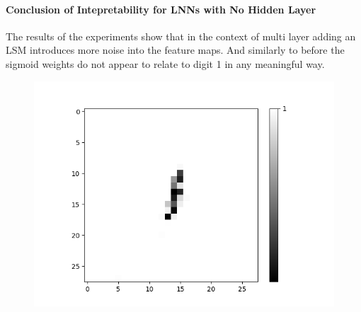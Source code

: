 \begin{minipage}[t]{0.45\textwidth}
	\vspace{0px}
	\paragraph{Conclusion of Intepretability for LNNs with No Hidden Layer}
	The results of the experiments show that in the context of multi layer adding an LSM introduces more noise into the feature maps. And similarly to before the sigmoid weights do not appear to relate to digit 1 in any meaningful way.
\end{minipage}
\hspace{0.1\textwidth}
\begin{minipage}[t]{0.45\textwidth}
	\vspace{0px}
	\begin{figure}[H]
		\centering
		\begin{minipage}[b]{0.5\textwidth}
			\captionsetup{labelformat=empty}
			\includegraphics[width=\textwidth]{AND-OR(W-LSM)(1)/Like/True/Layer0-Neuron-9.png}
			\label{}
		\end{minipage}
		
		\medskip
		

\end{figure}
\end{minipage}
